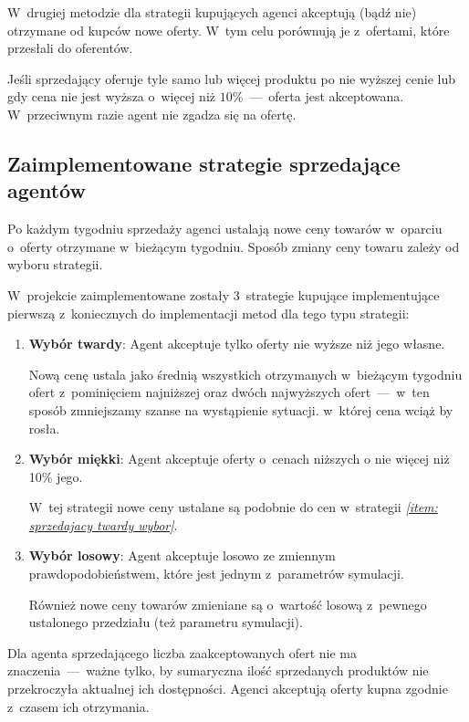 \documentclass[12pt]{article}
\makeatletter
\def\namedlabel#1#2{\begingroup
   \def\@currentlabel{#2}%
   \label{#1}\endgroup
}
\makeatother
\begin{document}
W~drugiej metodzie dla strategii kupujących agenci akceptują (bądź nie) otrzymane od kupców nowe oferty. W~tym celu porównują je z~ofertami, które przesłali do oferentów. 

Jeśli sprzedający oferuje tyle samo
lub więcej produktu po nie wyższej cenie lub gdy cena nie jest wyższa o~więcej niż $10\%$~---~oferta jest akceptowana. W~przeciwnym razie agent nie zgadza się na ofertę.

\subsection{Zaimplementowane strategie sprzedające agentów}
Po każdym tygodniu sprzedaży agenci ustalają nowe ceny towarów w~oparciu o~oferty otrzymane w~bieżącym tygodniu. Sposób zmiany ceny towaru zależy od wyboru strategii.

W~projekcie zaimplementowane zostały 3~strategie kupujące implementujące pierwszą z~koniecznych do implementacji metod dla tego typu strategii:
\begin{enumerate}
 \item \namedlabel{item: sprzedajacy twardy wybor}{Wybór twardy} \textbf{Wybór twardy}: Agent akceptuje tylko oferty nie wyższe niż jego własne.

Nową cenę ustala jako średnią wszystkich otrzymanych w~bieżącym tygodniu ofert z~pominięciem najniższej oraz dwóch najwyższych ofert~---~w~ten sposób zmniejszamy szanse na wystąpienie sytuacji. w~której cena 
wciąż by rosła.
 \item \namedlabel{item: sprzedajacy miekki wybor}{Wybór miękki} \textbf{Wybór miękki}: Agent akceptuje oferty o~cenach niższych o nie więcej niż 10\% jego.

W~tej strategii nowe ceny ustalane są podobnie do cen w~strategii \emph{\ref{item: sprzedajacy twardy wybor}}.

 \item \textbf{Wybór losowy}: Agent akceptuje losowo ze zmiennym prawdopodobieństwem, które jest jednym z~parametrów symulacji.

Również nowe ceny towarów zmieniane są o~wartość losową z~pewnego ustalonego przedziału (też parametru symulacji).
\end{enumerate}

Dla agenta sprzedającego liczba zaakceptowanych ofert nie ma znaczenia~---~ważne tylko, by sumaryczna ilość sprzedanych produktów nie przekroczyła aktualnej ich dostępności. Agenci akceptują oferty kupna
zgodnie z~czasem ich otrzymania.
\end{document}
